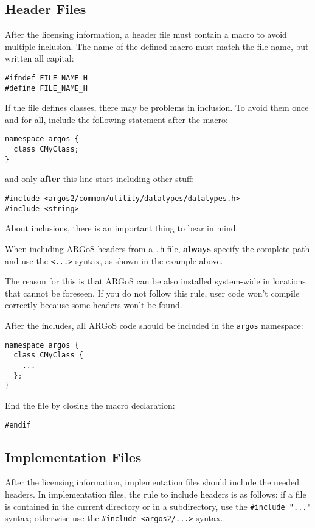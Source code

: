 \documentclass[a4paper]{article}
\newcommand{\argos}{ARGoS\xspace}
\begin{document}
\subsection{Header Files}
\label{subsec:headers}
After the licensing information, a header file must contain a macro to
avoid multiple inclusion. The name of the defined macro must match the
file name, but written all capital:
%
\begin{lstlisting}
#ifndef FILE_NAME_H
#define FILE_NAME_H
\end{lstlisting}
%
If the file defines classes, there may be problems in inclusion. To
avoid them once and for all, include the following statement after the macro:
%
\begin{lstlisting}
namespace argos {
  class CMyClass;
}
\end{lstlisting}
%
and only {\bf after} this line start including other stuff:
%
\begin{lstlisting}
#include <argos2/common/utility/datatypes/datatypes.h>
#include <string>
\end{lstlisting}
%
About inclusions, there is an important thing to bear in mind:
\begin{warning}
  When including \argos headers from a \verb!.h! file, {\bf always}
  specify the complete path and use the \verb!<...>! syntax, as shown in the
  example above.
\end{warning}
The reason for this is that \argos can be also installed system-wide in locations that
cannot be foreseen. If you do not follow this rule, user code won't compile
correctly because some headers won't be found.

After the includes, all \argos code should be included in the \verb!argos!
namespace:
%
\begin{lstlisting}
namespace argos {
  class CMyClass {
    ...
  };
}
\end{lstlisting}
%
End the file by closing the macro declaration:
%
\begin{lstlisting}
#endif
\end{lstlisting}

\subsection{Implementation Files}
\label{subsec:implementations}
After the licensing information, implementation files should include
the needed headers. In implementation files, the rule to include
headers is as follows: if a file is contained in the current directory
or in a subdirectory, use the \lstinline!#include "..."! syntax;
otherwise use the \lstinline!#include <argos2/...>! syntax.
\end{document}
